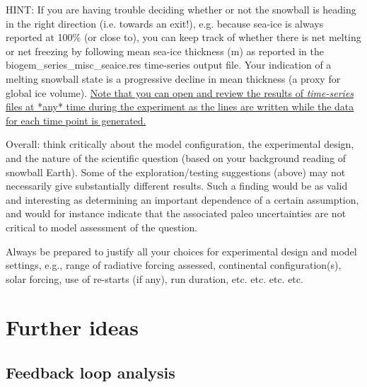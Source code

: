 HINT: If you are having trouble deciding whether or not the snowball is heading in the right direction (i.e. towards an exit!), e.g. because sea-ice is always reported at 100\% (or close to), you can keep track of whether there is net melting or net freezing by following mean sea-ice thickness (m) as reported in the \textsf{\footnotesize biogem\_series\_misc\_seaice.res} time-series output file. Your indication of a melting snowball state is a progressive decline in mean thickness (a proxy for global ice volume). \uline{Note that you can open and review the results of \textit{time-series} files at *any* time during the experiment as the lines are written while the data for each time point is generated.}

Overall: think critically about the model configuration, the experimental design, and the nature of the scientific question (based on your background reading of snowball Earth). Some of the exploration/testing suggestions (above) may not necessarily give substantially different results. Such a finding would be as valid and interesting as determining an important dependence of a certain assumption, and would for instance indicate that the associated paleo uncertainties are not critical to model assessment of the question.

Always be prepared to justify all your choices for experimental design and model settings, e.g., range of radiative forcing assessed, continental configuration(s), solar forcing, use of re-starts (if any), run duration, etc. etc. etc. etc.

\newpage

\section{Further ideas}


\subsection{Feedback loop analysis}

